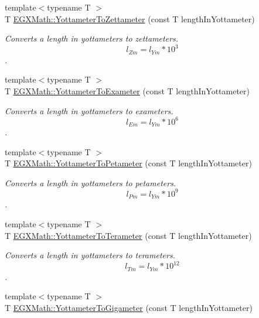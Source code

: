 \begin{DoxyCompactItemize}
{\footnotesize template$<$typename T $>$ }\\T \mbox{\hyperlink{group___e_g_x_math-_conversions-_length_conversions-_s_i-_yottameter-_s_i_gaec75915fd3b267aeff37cc104cfb3e9a}{E\+G\+X\+Math\+::\+Yottameter\+To\+Zettameter}} (const T length\+In\+Yottameter)
\begin{DoxyCompactList}\small\item\em Converts a length in yottameters to zettameters. \[ l_{Zm}=l_{Ym} * 10^{3} \]. \end{DoxyCompactList}\item 
{\footnotesize template$<$typename T $>$ }\\T \mbox{\hyperlink{group___e_g_x_math-_conversions-_length_conversions-_s_i-_yottameter-_s_i_ga596bb0befe41a04cc5e193786ccc8de7}{E\+G\+X\+Math\+::\+Yottameter\+To\+Exameter}} (const T length\+In\+Yottameter)
\begin{DoxyCompactList}\small\item\em Converts a length in yottameters to exameters. \[ l_{Em}=l_{Ym} * 10^{6} \]. \end{DoxyCompactList}\item 
{\footnotesize template$<$typename T $>$ }\\T \mbox{\hyperlink{group___e_g_x_math-_conversions-_length_conversions-_s_i-_yottameter-_s_i_gaf4b5d397ea5debc0bd5195ad3a5c23d5}{E\+G\+X\+Math\+::\+Yottameter\+To\+Petameter}} (const T length\+In\+Yottameter)
\begin{DoxyCompactList}\small\item\em Converts a length in yottameters to petameters. \[ l_{Pm}=l_{Ym} * 10^{9} \]. \end{DoxyCompactList}\item 
{\footnotesize template$<$typename T $>$ }\\T \mbox{\hyperlink{group___e_g_x_math-_conversions-_length_conversions-_s_i-_yottameter-_s_i_ga24c70c7a3a5081e794d7cf4a37264b6c}{E\+G\+X\+Math\+::\+Yottameter\+To\+Terameter}} (const T length\+In\+Yottameter)
\begin{DoxyCompactList}\small\item\em Converts a length in yottameters to terameters. \[ l_{Tm}=l_{Ym} * 10^{12} \]. \end{DoxyCompactList}\item 
{\footnotesize template$<$typename T $>$ }\\T \mbox{\hyperlink{group___e_g_x_math-_conversions-_length_conversions-_s_i-_yottameter-_s_i_ga206834b7977e8b15c0fe06e279655c2b}{E\+G\+X\+Math\+::\+Yottameter\+To\+Gigameter}} (const T length\+In\+Yottameter)

\end{DoxyCompactItemize}
